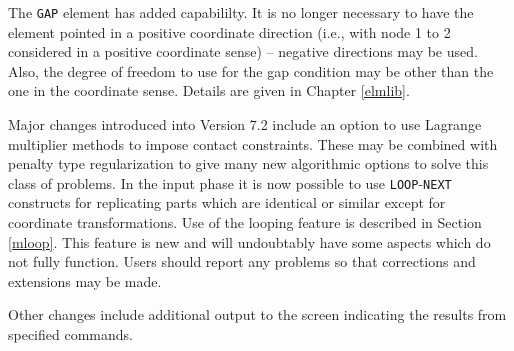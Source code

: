 The \texttt{GAP} element has added capabililty.
It is no longer necessary to have the element pointed in
a positive coordinate direction (i.e., with node 1 to 2 considered in
a positive coordinate sense) -- negative directions may be used.  Also,
the degree of freedom to use for the gap condition may be other than the
one in the coordinate sense.  Details are given in Chapter \ref{elmlib}.

Major changes introduced into Version 7.2 include an option to use Lagrange
multiplier methods to impose contact constraints.  These may be combined
with penalty type regularization to give many new algorithmic options to
solve this class of problems.  In the input phase it is now possible to
use \texttt{LOOP}-\texttt{NEXT} constructs for replicating parts which
are identical or similar except for coordinate transformations.  Use of
the looping feature is described in Section \ref{mloop}.  This
feature is new and will undoubtably have some aspects which do not fully
function.  Users should report any problems so that corrections and extensions
may be made.


Other changes include additional output to the screen indicating the
results from specified commands.
